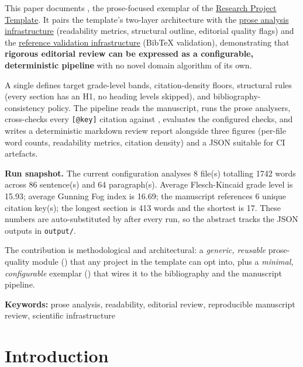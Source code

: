 \documentclass[
]{article}
\begin{document}
This paper documents , the
prose-focused exemplar of the
\href{https://github.com/docxology/template}{Research Project Template}.
It pairs the template's two-layer architecture with the
\href{https://github.com/docxology/template/tree/main/infrastructure/prose}{prose
analysis infrastructure} (readability metrics, structural outline,
editorial quality flags) and the
\href{https://github.com/docxology/template/tree/main/infrastructure/reference}{reference
validation infrastructure} (BibTeX validation), demonstrating that
\textbf{rigorous editorial review can be expressed as a configurable,
deterministic pipeline} with no novel domain algorithm of its own.

A single  defines target grade-level
bands, citation-density floors, structural rules (every section has an
H1, no heading levels skipped), and bibliography-consistency policy. The
pipeline reads the manuscript, runs the prose analysers, cross-checks
every \texttt{{[}@key{]}} citation against
, evaluates the configured checks, and
writes a deterministic markdown review report alongside three figures
(per-file word counts, readability metrics, citation density) and a JSON
 suitable for CI artefacts.

\textbf{Run snapshot.} The current configuration analyses 8 file(s)
totalling 1742 words across 86 sentence(s) and 64 paragraph(s). Average
Flesch-Kincaid grade level is 15.93; average Gunning Fog index is 16.69;
the manuscript references 6 unique citation key(s); the longest section
is 413 words and the shortest is 17. These numbers are auto-substituted
by  after every
run, so the abstract tracks the JSON outputs in \texttt{output/}.

The contribution is methodological and architectural: a \emph{generic,
reusable} prose-quality module () that any
project in the template can opt into, plus a \emph{minimal,
configurable} exemplar
() that wires it to
the bibliography and the manuscript pipeline.

\textbf{Keywords:} prose analysis, readability, editorial review,
reproducible manuscript review, scientific infrastructure

\newpage

\section{Introduction}\label{sec:introduction}
\end{document}
